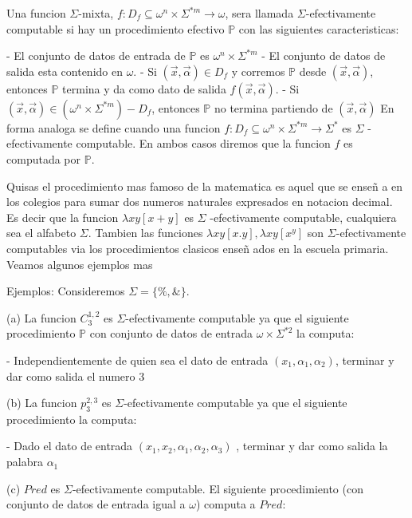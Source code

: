 Una funcion \(\Sigma \)-mixta, \(f:D_{f}\subseteq \omega ^{n}\times \Sigma ^{\ast m}\rightarrow \omega \), sera llamada \(\Sigma \)-efectivamente computable si hay un procedimiento efectivo \(\mathbb{P}\) con las siguientes caracteristicas:

- El conjunto de datos de entrada de \(\mathbb{P}\) es \(\omega ^{n}\times \Sigma ^{\ast m}\)
- El conjunto de datos de salida esta contenido en \(\omega \).
- Si \((\vec{x},\vec{\alpha})\in D_{f}\) y corremos \(\mathbb{P}\) desde \( (\vec{x},\vec{\alpha})\), entonces \(\mathbb{P}\) termina y da como dato de salida \(f(\vec{x},\vec{\alpha})\).
- Si \((\vec{x},\vec{\alpha})\in (\omega ^{n}\times \Sigma ^{\ast m})-D_{f}\), entonces \(\mathbb{P}\) no termina partiendo de \((\vec{x},\vec{ \alpha})\)
En forma analoga se define cuando una funcion \(f:D_{f}\subseteq \omega ^{n}\times \Sigma ^{\ast m}\rightarrow \Sigma ^{\ast }\) es \(\Sigma \) -efectivamente computable. En ambos casos diremos que la funcion \(f\) es computada por \(\mathbb{P}\).

Quisas el procedimiento mas famoso de la matematica es aquel que se ense\~{n} a en los colegios para sumar dos numeros naturales expresados en notacion decimal. Es decir que la funcion \(\lambda xy\left[ x+y\right] \) es \(\Sigma \) -efectivamente computable, cualquiera sea el alfabeto \(\Sigma \). Tambien las funciones \(\lambda xy\left[ x.y\right] ,\lambda xy\left[ x^{y}\right] \) son \( \Sigma \)-efectivamente computables via los procedimientos clasicos ense\~{n} ados en la escuela primaria. Veamos algunos ejemplos mas

Ejemplos: Consideremos \(\Sigma =\{\%,\& \}\).

(a) La funcion \(C_{3}^{1,2}\) es \(\Sigma \)-efectivamente computable ya que el siguiente procedimiento \(\mathbb{P}\) con conjunto de datos de entrada \( \omega \times \Sigma ^{\ast 2}\) la computa:

- Independientemente de quien sea el dato de entrada \((x_{1},\alpha _{1},\alpha _{2})\), terminar y dar como salida el numero \(3\)

(b) La funcion \(p_{3}^{2,3}\) es \(\Sigma \)-efectivamente computable ya que el siguiente procedimiento la computa:

- Dado el dato de entrada \((x_{1},x_{2},\alpha _{1},\alpha _{2},\alpha _{3})\) , terminar y dar como salida la palabra \(\alpha _{1}\)

(c) \(Pred\) es \(\Sigma \)-efectivamente computable. El siguiente procedimiento (con conjunto de datos de entrada igual a \(\omega \)) computa a \(Pred\):

